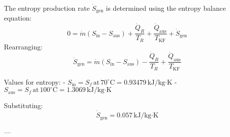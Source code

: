 The entropy production rate \( \dot{S}_{\text{gen}} \) is determined using the entropy balance equation:  
\[
0 = \dot{m} \left(S_{\text{in}} - S_{\text{aus}}\right) + \frac{\dot{Q}_R}{T_R} + \frac{\dot{Q}_{\text{aus}}}{T_{\text{KF}}} + \dot{S}_{\text{gen}}
\]  
Rearranging:  
\[
\dot{S}_{\text{gen}} = \dot{m} \left(S_{\text{in}} - S_{\text{aus}}\right) - \frac{\dot{Q}_R}{T_R} + \frac{\dot{Q}_{\text{aus}}}{T_{\text{KF}}}
\]  

Values for entropy:  
- \( S_{\text{in}} = S_f \, \text{at} \, 70^\circ\text{C} = 0.93479 \, \text{kJ/kg·K} \)  
- \( S_{\text{aus}} = S_f \, \text{at} \, 100^\circ\text{C} = 1.3069 \, \text{kJ/kg·K} \)  

Substituting:  
\[
\dot{S}_{\text{gen}} = 0.057 \, \text{kJ/kg·K}
\]  

---